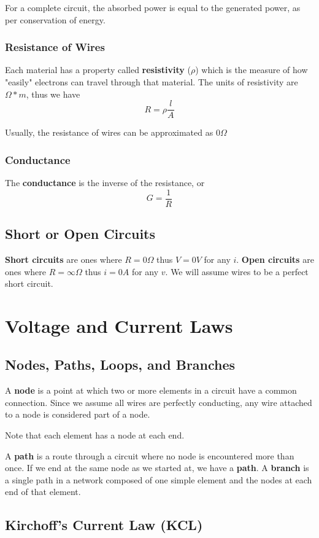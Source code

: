 \documentclass[12pt]{article}
\begin{document}
For a complete circuit, the absorbed power is equal to the generated power, as per conservation of energy.

\subsubsection*{Resistance of Wires}
Each material has a property called {\bf resistivity} ($\rho$) which is the measure of how "easily" electrons can travel through that material. The units of resistivity are $\Omega *m$, thus we have \[ R = \rho\frac{l}{A} \]

Usually, the resistance of wires can be approximated as $0 \Omega$

\subsubsection*{Conductance}
The {\bf conductance} is the inverse of the resistance, or \[ G = \frac{1}{R} \]

\subsection*{Short or Open Circuits}
{\bf Short circuits} are ones where $R = 0\Omega$ thus $V = 0V$ for any $i$. {\bf Open circuits} are ones where $R = \infty\Omega$ thus $i = 0A$ for any $v$. We will assume wires to be a perfect short circuit.

\section*{Voltage and Current Laws}
\subsection*{Nodes, Paths, Loops, and Branches}
A {\bf node} is a point at which two or more elements in a circuit have a common connection. Since we assume all wires are perfectly conducting, any wire attached to a node is considered part of a node.

Note that each element has a node at each end.

A {\bf path} is a route through a circuit where no node is encountered more than once. If we end at the same node as we started at, we have a {\bf path}. A {\bf branch} is a single path in a network composed of one simple element and the nodes at each end of that element.

\subsection*{Kirchoff's Current Law (KCL)}
\end{document}
